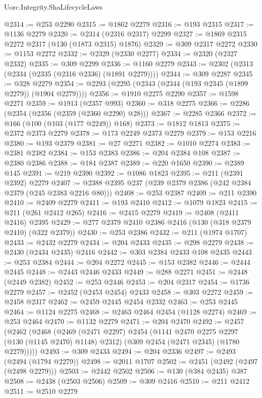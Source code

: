 \begin{lexlean}{Uorc.Integrity.ShaLifecycleLaws}
\begin{coremodule}
@2314 := @253 @2290
@2315 := @1862 @2279
@2316 := @193 @2315
@2317 := @1136 @2279
@2320 := @2314 (@2316 @2317) @2299
@2327 := @1869 @2315 @2272 @2317 (@130 (@1873 @2315) @1876)
@2329 := @309 @2317 @2272
@2330 := @1153 @2272
@2332 := @2329 (@2330 @2277)
@2334 := @2320 (@2327 @2332)
@2335 := @309 @2299
@2336 := @1160 @2279
@2343 := @2302 (@2313 (@2334 (@2335 (@2316 @2336) (@1891 @2279))))
@2344 := @309 @2287
@2345 := @328 @2279
@2354 := @2293 (@2295 (@2343 (@2344 (@193 @2345 (@1899 @2279)) (@1904 @2279))))
@2356 := @1910 @2275 @2290
@2357 := @1598 @2271
@2359 := @1913 (@2357 @993)
@2360 := @318 @2275
@2366 := @2286 (@2354 (@2356 (@2359 (@2360 @2290) @28)))
@2367 := @2285 @2366
@2372 := @166 (@100 (@103 (@177 @2249)) @168)
@2373 := @1812 @1813
@2375 := @2372 @2373 @2279
@2378 := @173 @2249 @2373 @2279
@2379 := @153 @2216
@2380 := @193 @2379
@2381 := @27 @2271
@2382 := @1010 @2274
@2383 := @2381 @2382
@2384 := @153 @2383
@2386 := @204 @2384 @108
@2387 := @2380 @2386
@2388 := @184 @2387
@2389 := @220 @1650
@2390 := @2389 @145
@2391 := @219 @2390
@2392 := @1086 @1823
@2395 := @211 (@2391 @2392) @2279
@2407 := @2388 @2395 @237 (@239 @2379 @2386 (@242 @2384 @2379 (@245 @2383 @2216 @80)))
@2408 := @253 @2387
@2409 := @211 @2390
@2410 := @2409 @2279
@2411 := @193 @2410
@2412 := @1079 @1823
@2415 := @211 (@261 @2412 @265)
@2416 := @2415 @2279
@2419 := @2408 (@2411 @2416) @2395
@2429 := @277 @2379 @2410 @2386 @2416 (@130 (@318 @2379 @2410) (@322 @2379))
@2430 := @253 @2386
@2432 := @211 (@1974 @1707)
@2433 := @2432 @2279
@2434 := @204 @2433
@2435 := @298 @2279
@2438 := @2430 (@2434 @2435) @2416
@2442 := @303 @2384 @2433 @108 @2435
@2443 := @253 @2384
@2444 := @204 @2272
@2445 := @153 @2382
@2446 := @2444 @2445
@2448 := @2443 @2446 @2433
@2449 := @288 @2271
@2451 := @2448 (@2449 @2382)
@2452 := @253 @2446
@2453 := @204 @2317
@2454 := @1736 @2279
@2457 := @2452 (@2453 @2454) @2433
@2458 := @303 @2272
@2459 := @2458 @2317
@2462 := @2459 @2445 @2454 @2332
@2463 := @253 @2445
@2464 := @1124 @2275
@2468 := @2463 @2464 @2454 (@1128 @2274)
@2469 := @253 @2464
@2470 := @1132 @2279
@2471 := @204 @2470
@2492 := @2457
    (@2462
      (@2468
        (@2469
          (@2471 @2297)
          @2454
          (@1141 @2470 @2275 @2297 (@130 (@1145 @2470) @1148) @2312)
          (@309 @2454 (@2471 @2345) (@1780 @2279)))))
@2493 := @309 @2433
@2494 := @204 @2336
@2497 := @2493 (@2494 (@1794 @2279))
@2498 := @2011 @1707
@2502 := @2451 (@2492 (@2497 (@2498 @2279)))
@2503 := @2442 @2502
@2506 := @130 (@384 @2435) @387
@2508 := @2438 (@2503 @2506)
@2509 := @309 @2416
@2510 := @211 @2412
@2511 := @2510 @2279

\end{coremodule}
\end{lexlean}
